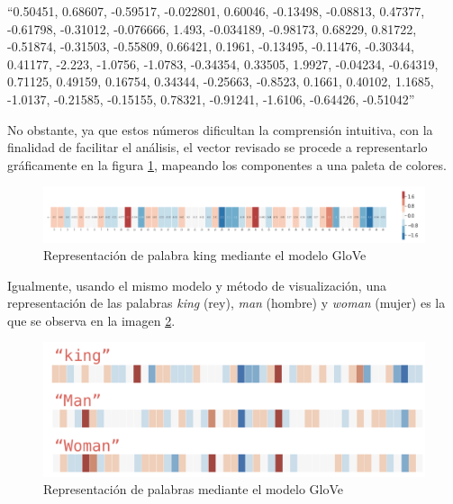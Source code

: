 \documentclass[
  12pt,
  openany]{book}
\begin{document}
``0.50451, 0.68607, -0.59517, -0.022801, 0.60046, -0.13498, -0.08813, 0.47377, -0.61798, -0.31012, -0.076666, 1.493, -0.034189, -0.98173, 0.68229, 0.81722, -0.51874, -0.31503, -0.55809, 0.66421, 0.1961, -0.13495, -0.11476, -0.30344, 0.41177, -2.223, -1.0756, -1.0783, -0.34354, 0.33505, 1.9927, -0.04234, -0.64319, 0.71125, 0.49159, 0.16754, 0.34344, -0.25663, -0.8523, 0.1661, 0.40102, 1.1685, -1.0137, -0.21585, -0.15155, 0.78321, -0.91241, -1.6106, -0.64426, -0.51042''

No obstante, ya que estos números dificultan la comprensión intuitiva, con la finalidad de facilitar el análisis, el vector revisado se procede a representarlo gráficamente en la figura \ref{fig:embking}, mapeando los componentes a una paleta de colores.

\begin{figure}

{\centering \includegraphics[width=0.95\linewidth]{images/03-marco-teorico/embking} 

}

\caption{Representación de palabra king mediante el modelo GloVe}\label{fig:embking}
\end{figure}

Igualmente, usando el mismo modelo y método de visualización, una representación de las palabras \emph{king} (rey), \emph{man} (hombre) y \emph{woman} (mujer) es la que se observa en la imagen \ref{fig:GloVeEmbedd}.

\begin{figure}

{\centering \includegraphics[width=0.95\linewidth]{images/03-marco-teorico/embedding} 

}

\caption{Representación de palabras mediante el modelo GloVe}\label{fig:GloVeEmbedd}
\end{figure}
\end{document}

